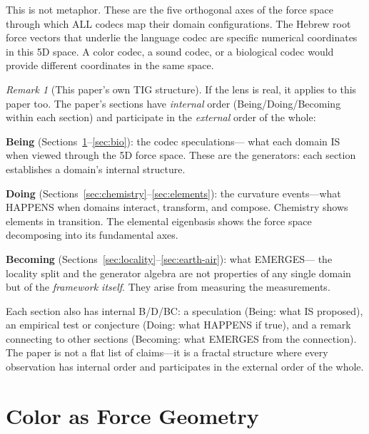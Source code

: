 \documentclass[11pt]{article}
\theoremstyle{definition}
\theoremstyle{remark}
\newtheorem{remark}[theorem]{Remark}
\begin{document}
This is not metaphor.  These are the five orthogonal axes of the force space through
which ALL codecs map their domain configurations.  The Hebrew root force vectors that
underlie the language codec are specific numerical coordinates in this 5D space.  A
color codec, a sound codec, or a biological codec would provide different coordinates
in the same space.

\begin{remark}[This paper's own TIG structure]
\label{rem:self-structure}
If the lens is real, it applies to this paper too.  The paper's sections have
\emph{internal} order (Being/Doing/Becoming within each section) and participate
in the \emph{external} order of the whole:

\textbf{Being} (Sections~\ref{sec:color}--\ref{sec:bio}): the codec speculations---
what each domain IS when viewed through the 5D force space.  These are the generators:
each section establishes a domain's internal structure.

\textbf{Doing} (Sections~\ref{sec:chemistry}--\ref{sec:elements}): the curvature
events---what HAPPENS when domains interact, transform, and compose.  Chemistry shows
elements in transition.  The elemental eigenbasis shows the force space decomposing into
its fundamental axes.

\textbf{Becoming} (Sections~\ref{sec:locality}--\ref{sec:earth-air}): what EMERGES---
the locality split and the generator algebra are not properties of any single domain but
of the \emph{framework itself}.  They arise from measuring the measurements.

Each section also has internal B/D/BC: a speculation (Being: what IS proposed),
an empirical test or conjecture (Doing: what HAPPENS if true), and a remark connecting
to other sections (Becoming: what EMERGES from the connection).  The paper is not a flat
list of claims---it is a fractal structure where every observation has internal order
and participates in the external order of the whole.
\end{remark}

\section{Color as Force Geometry}
\label{sec:color}
\end{document}
